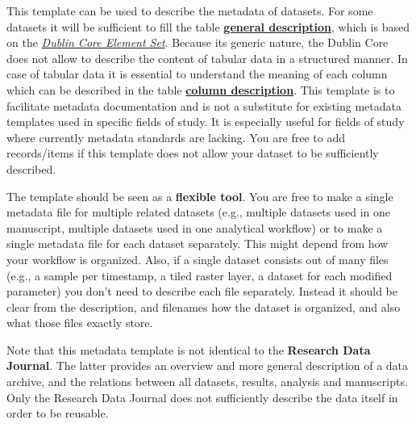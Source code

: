 \documentclass[12pt]{article}
\begin{document}
\newline

This template can be used to describe the metadata of datasets. For some datasets it will be sufficient to fill the table \textbf{\hyperref[sec:generaldescription]{general description}}, which is based on the \textit{\textcolor[HTML]{BC0031}{\href{https://guides.library.ucsc.edu/c.php?g=618773\&p=4306386}{Dublin Core Element Set}}}. Because its generic nature, the Dublin Core does not allow to describe the content of tabular data in a structured manner. In case of tabular data it is essential to understand the meaning of each column which can be described in the table \textbf{\hyperref[sec:columndescription]{column description}}. This template is to facilitate metadata documentation and is not a substitute for existing metadata templates used in specific fields of study. It is especially useful for fields of study where currently metadata standards are lacking. You are free to add records/items if this template does not allow your dataset to be sufficiently described.
\newline

The template should be seen as a \textbf{flexible tool}. You are free to make a single metadata file for multiple related datasets (e.g., multiple datasets used in one manuscript, multiple datasets used in one analytical workflow) or to make a single metadata file for each dataset separately. This might depend from how your workflow is organized. Also, if a single dataset consists out of many files (e.g., a sample per timestamp, a tiled raster layer, a dataset for each modified parameter) you don't need to describe each file separately. Instead it should be clear from the description, and filenames how the dataset is organized, and also what those files exactly store. 
\newline

Note that this metadata template is not identical to the \textbf{Research Data Journal}. The latter provides an overview and more general description of a data archive, and the relations between all datasets, results, analysis and manuscripts. Only the Research Data Journal does not sufficiently describe the data itself in order to be reusable.
\newline 
\end{document}

